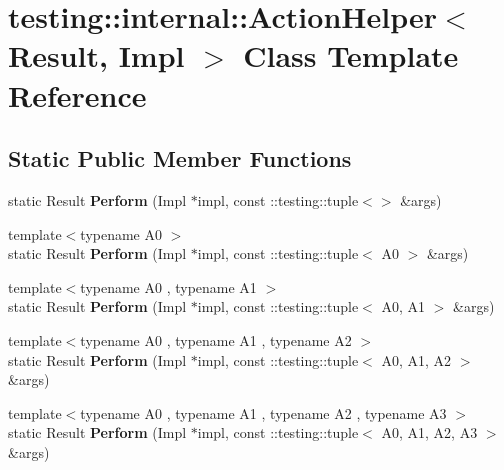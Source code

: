 \hypertarget{classtesting_1_1internal_1_1ActionHelper}{}\section{testing\+:\+:internal\+:\+:Action\+Helper$<$ Result, Impl $>$ Class Template Reference}
\label{classtesting_1_1internal_1_1ActionHelper}
\subsection*{Static Public Member Functions}
\begin{DoxyCompactItemize}
\item 
static Result {\bfseries Perform} (Impl $\ast$impl, const \+::testing\+::tuple$<$$>$ \&args)\hypertarget{classtesting_1_1internal_1_1ActionHelper_a25176836b0a381d883d61c3a2dc60662}{}\label{classtesting_1_1internal_1_1ActionHelper_a25176836b0a381d883d61c3a2dc60662}

\item 
{\footnotesize template$<$typename A0 $>$ }\\static Result {\bfseries Perform} (Impl $\ast$impl, const \+::testing\+::tuple$<$ A0 $>$ \&args)\hypertarget{classtesting_1_1internal_1_1ActionHelper_a08d2e199b0a3a1f9e05982cae07db3ec}{}\label{classtesting_1_1internal_1_1ActionHelper_a08d2e199b0a3a1f9e05982cae07db3ec}

\item 
{\footnotesize template$<$typename A0 , typename A1 $>$ }\\static Result {\bfseries Perform} (Impl $\ast$impl, const \+::testing\+::tuple$<$ A0, A1 $>$ \&args)\hypertarget{classtesting_1_1internal_1_1ActionHelper_a96d8d8399ff3322e77ba1de51c166f4e}{}\label{classtesting_1_1internal_1_1ActionHelper_a96d8d8399ff3322e77ba1de51c166f4e}

\item 
{\footnotesize template$<$typename A0 , typename A1 , typename A2 $>$ }\\static Result {\bfseries Perform} (Impl $\ast$impl, const \+::testing\+::tuple$<$ A0, A1, A2 $>$ \&args)\hypertarget{classtesting_1_1internal_1_1ActionHelper_ad450478d185cbcac0e1383f7517f5c36}{}\label{classtesting_1_1internal_1_1ActionHelper_ad450478d185cbcac0e1383f7517f5c36}

\item 
{\footnotesize template$<$typename A0 , typename A1 , typename A2 , typename A3 $>$ }\\static Result {\bfseries Perform} (Impl $\ast$impl, const \+::testing\+::tuple$<$ A0, A1, A2, A3 $>$ \&args)\hypertarget{classtesting_1_1internal_1_1ActionHelper_a2ceda08aeb7b9fd1ad6ccb0821a3ea39}{}\label{classtesting_1_1internal_1_1ActionHelper_a2ceda08aeb7b9fd1ad6ccb0821a3ea39}


\end{DoxyCompactItemize}
